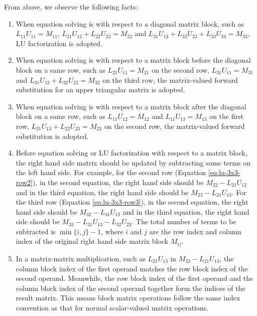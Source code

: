 \documentclass[11pt, a4paper]{book}
\begin{document}
From above, we observe the following facts:
\begin{enumerate}
\item When equation solving is with respect to a diagonal matrix block, such as
  $L_{11}U_{11} = M_{11}$, $L_{21}U_{12} + L_{22}U_{22} = M_{22}$ and
  $L_{31}U_{13} + L_{32}U_{23} + L_{33}U_{33} = M_{33}$, LU factorization is adopted.
\item When equation solving is with respect to a matrix block before the diagonal block on
  a same row, such as $L_{21}U_{11} = M_{21}$ on the second row, $L_{31}U_{11} = M_{31}$
  and $L_{31}U_{12} + L_{32}U_{22} = M_{32}$ on the third row, the matrix-valued forward
  substitution for an upper triangular matrix is adopted.
\item When equation solving is with respect to a matrix block after the diagonal block on
  a same row, such as $L_{11}U_{12} = M_{12}$ and $L_{11}U_{13} =M_{13}$ on the first
  row, $L_{21}U_{13} + L_{22}U_{23} = M_{23}$ on the second row, the matrix-valued forward
  substitution is adopted.
\item Before equation solving or LU factorization with respect to a matrix block, the
  right hand side matrix should be updated by subtracting some terms on the left hand
  side. For example, for the second row (Equation \eqref{eq:lu-3x3-row2}), in the second
  equation, the right hand side should be $M_{22} - L_{21}U_{12}$ and in the third
  equation, the right hand side should be $M_{23} - L_{21}U_{13}$. For the third row
  (Equation \eqref{eq:lu-3x3-row3}), in the second equation, the right hand side should be
  $M_{32} - L_{31}U_{12}$ and in the third equation, the right hand side should be
  $M_{33} - L_{31}U_{13} - L_{32}U_{23}$. The total number of terms to be subtracted is
  $\min\{i,j\} - 1$, where $i$ and $j$ are the row index and column index of the original
  right hand side matrix block $M_{ij}$.
\item In a matrix-matrix multiplication, such as $L_{21}U_{13}$ in
  $M_{23} - L_{21}U_{13}$, the column block index of the first operand matches the row
  block index of the second operand. Meanwhile, the row block index of the first operand
  and the column block index of the second operand together form the indices of the result
  matrix. This means block matrix operations follow the same index convention as that for
  normal scalar-valued matrix operations.
\end{enumerate}
\end{document}

